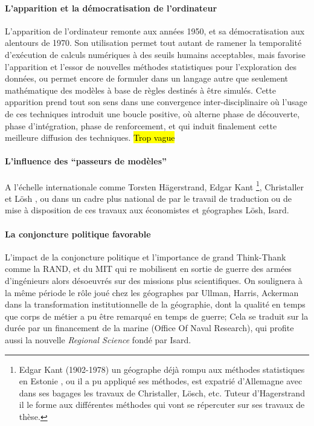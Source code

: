 \paragraph{L'apparition et la démocratisation de l'ordinateur}

L'apparition de l'ordinateur remonte aux années 1950, et sa démocratisation aux alentours de 1970. Son utilisation permet tout autant de ramener la temporalité d'exécution de calculs numériques à des seuils humains acceptables, mais favorise l'apparition et l'essor de nouvelles méthodes statistiques pour l'exploration des données, ou permet encore de formuler dans un langage autre que seulement mathématique des modèles à base de règles destinés à être simulés. Cette apparition prend tout son sens dans une convergence inter-disciplinaire où l'usage de ces techniques introduit une boucle positive, où alterne phase de découverte, phase d'intégration, phase de renforcement, et qui induit finalement cette meilleure diffusion des techniques. \hl{Trop vague}

\paragraph{L'influence des \enquote{passeurs de modèles}}

A l'échelle internationale comme Torsten Hägerstrand, Edgar Kant \footnote{Edgar Kant (1902-1978) un géographe déjà rompu aux méthodes statistiques en Estonie \autocite{Chabot1937} , ou il a pu appliqué ses méthodes, est expatrié d'Allemagne avec dans ses bagages les travaux de Christaller, Lösch, etc. Tuteur d'Hagerstrand il le forme aux différentes méthodes qui vont se répercuter sur ses travaux de thèse.}, Christaller et Lösh \autocite[119]{Berry1970}, ou dans un cadre plus national de par le travail de traduction ou de mise à disposition de ces travaux aux économistes et géographes Lösh, Isard.

\paragraph{La conjoncture politique favorable}

L'impact de la conjoncture politique et l'importance de grand Think-Thank comme la RAND, et du MIT qui re mobilisent en sortie de guerre des armées d'ingénieurs alors désoeuvrés sur des missions plus scientifiques. On soulignera à la même période le rôle joué chez les géographes par Ullman, Harris, Ackerman dans la transformation institutionnelle de la géographie, dont la qualité en temps que corps de métier a pu être remarqué en temps de guerre; Cela se traduit sur la durée par un financement de la marine (Office Of Naval Research), qui profite aussi la nouvelle \textit{Regional Science} fondé par Isard.

